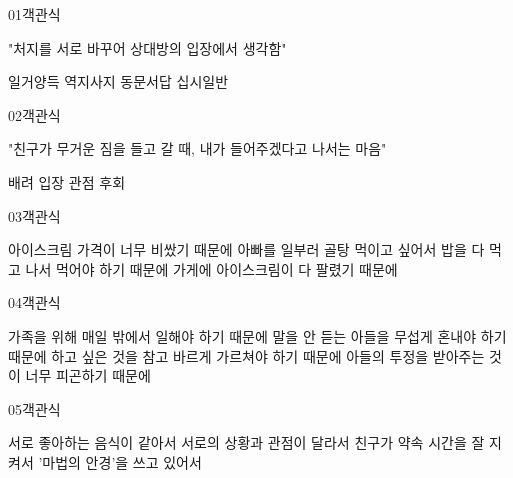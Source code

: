 \documentclass[fs12,seriesSau]{korfarm-base}
\begin{document}
\begin{kfQBlock}{01}{객관식}
\begin{kfEvidence}"처지를 서로 바꾸어 상대방의 입장에서 생각함"\end{kfEvidence}
\begin{kfChoices}
\kfChoice 일거양득
\kfChoice 역지사지
\kfChoice 동문서답
\kfChoice 십시일반
\end{kfChoices}
\end{kfQBlock}

\begin{kfQBlock}{02}{객관식}
\begin{kfEvidence}"친구가 무거운 짐을 들고 갈 때, 내가 들어주겠다고 나서는 마음"\end{kfEvidence}
\begin{kfChoices}
\kfChoice 배려
\kfChoice 입장
\kfChoice 관점
\kfChoice 후회
\end{kfChoices}
\end{kfQBlock}

\begin{kfQBlock}{03}{객관식}
\begin{kfChoices}
\kfChoice 아이스크림 가격이 너무 비쌌기 때문에
\kfChoice 아빠를 일부러 골탕 먹이고 싶어서
\kfChoice 밥을 다 먹고 나서 먹어야 하기 때문에
\kfChoice 가게에 아이스크림이 다 팔렸기 때문에
\end{kfChoices}
\end{kfQBlock}

\begin{kfQBlock}{04}{객관식}
\begin{kfChoices}
\kfChoice 가족을 위해 매일 밖에서 일해야 하기 때문에
\kfChoice 말을 안 듣는 아들을 무섭게 혼내야 하기 때문에
\kfChoice 하고 싶은 것을 참고 바르게 가르쳐야 하기 때문에
\kfChoice 아들의 투정을 받아주는 것이 너무 피곤하기 때문에
\end{kfChoices}
\end{kfQBlock}

\begin{kfQBlock}{05}{객관식}
\begin{kfChoices}
\kfChoice 서로 좋아하는 음식이 같아서
\kfChoice 서로의 상황과 관점이 달라서
\kfChoice 친구가 약속 시간을 잘 지켜서
\kfChoice '마법의 안경'을 쓰고 있어서
\end{kfChoices}
\end{kfQBlock}
\end{document}
